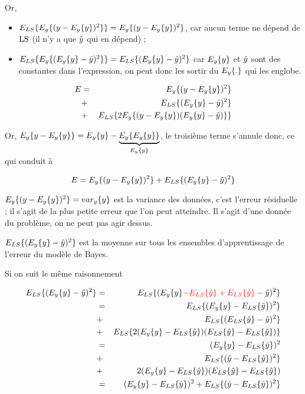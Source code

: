 	Or,
	
	\begin{itemize}
		\item $E_{LS}\{E_y\{(y - E_y\{y\})^2\}\} = E_y\{(y - E_y\{y\})^2\}$, car aucun terme ne dépend de $\text{LS}$ (il n'y a que $\hat{y}$ qui en dépend) ;
		\item $E_{LS}\{E_y\{(E_y\{y\} - \hat{y})^2\}\} = E_{LS}\{(E_y\{y\} - \hat{y})^2\}$ car $E_y\{y\}$ et $\hat{y}$ sont des constantes dans l'expression, on peut donc les sortir du $E_y\{.\}$ qui les englobe.
	\end{itemize}
	
	\begin{eqnarray*}
  	E & = & E_y\{(y - E_y\{y\})^2\} \\
  	 & + & E_{LS}\{(E_y\{y\} - \hat{y})^2\} \\
  	 & + & E_{LS}\{2E_y\{(y - E_y\{y\})(E_y\{y\} - \hat{y})\}\}
	\end{eqnarray*}
	
	Or, $E_y\{y - E_y\{y\}\} = E_y\{y\} - \underbrace{E_y\{E_y\{y\}\}}_{E_y\{y\}}$, le troisième terme s'annule donc, ce qui conduit à
	
	$$E =E_y\{(y - E_y\{y\})^2\} + E_{LS}\{(E_y\{y\} - \hat{y})^2\}$$
	
	$E_y\{(y - E_y\{y\})^2\} = var_y\{y\}$ est la variance des données, c'est l'erreur résiduelle ; il s'agit de la plus petite erreur que l'on peut atteindre. Il s'agit d'une donnée du problème, on ne peut pas agir dessus.
	
	$E_{LS}\{(E_y\{y\} - \hat{y})^2\}$ est la moyenne sur tous les ensembles d'apprentissage de l'erreur du modèle de Bayes.
	
	
	Si on suit le même raisonnement
	
	\begin{eqnarray*}
  	E_{LS}\{(E_y\{y\} - \hat{y})^2\} & = & E_{LS}\{(E_y\{y\} \textcolor{red}{- E_{LS}\{\hat{y}\} + E_{LS}\{\hat{y}\}} - \hat{y})^2\} \\
  	 & = & E_{LS}\{(E_y\{y\} - E_{LS}\{\hat{y}\})^2\} \\
  	 & + & E_{LS}\{(E_{LS}\{\hat{y}\} - \hat{y})^2\} \\
  	 & + & E_{LS}\{2(E_y\{y\} - E_{LS}\{\hat{y}\})(E_{LS}\{\hat{y}\} - E_{LS}\{\hat{y}\})\} \\
  	 & = & (E_y\{y\} - E_{LS}\{\hat{y}\})^2 \\
  	 & + & E_{LS}\{(\hat{y} - E_{LS}\{\hat{y}\})^2\} \\
  	 & + & 2(E_y\{y\} - E_{LS}\{\hat{y}\})(E_{LS}\{\hat{y}\} - E_{LS}\{\hat{y}\}) \\
  	 & = & (E_y\{y\} - E_{LS}\{\hat{y}\})^2 + E_{LS}\{(\hat{y} - E_{LS}\{\hat{y}\})^2\}
	\end{eqnarray*}
	

